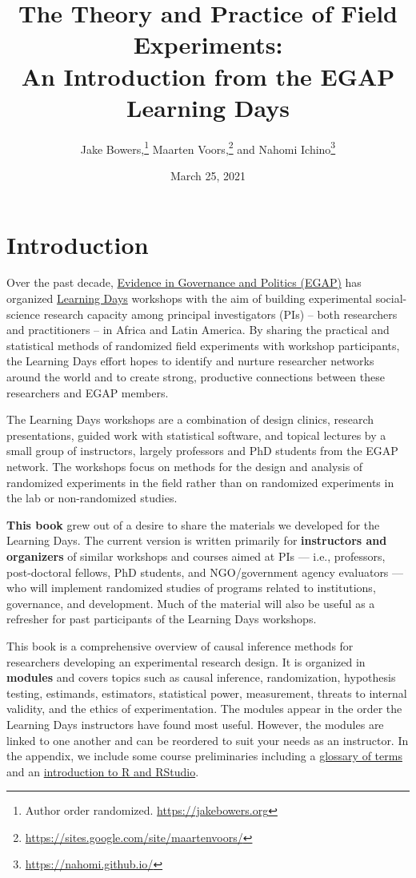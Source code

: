 \documentclass[12pt,]{book}
\title{The Theory and Practice of Field Experiments:\\
An Introduction from the EGAP Learning Days}
\author{Jake Bowers,\footnote{Author order randomized. \url{https://jakebowers.org}} Maarten Voors,\footnote{\url{https://sites.google.com/site/maartenvoors/}} and Nahomi Ichino\footnote{\url{https://nahomi.github.io/}}}
\date{March 25, 2021}
\begin{document}
\maketitle

\captionsetup[table]{list=no}
\captionsetup[figure]{list=no}

{
\hypersetup{linkcolor=}
\setcounter{tocdepth}{1}
\tableofcontents
}
\hypertarget{introduction}{%
\chapter{Introduction}\label{introduction}}

Over the past decade, \href{http://egap.org/}{Evidence in Governance and Politics (EGAP)} has organized \href{https://egap.org/learning-days/}{Learning Days} workshops with the aim of building experimental social-science research capacity among principal investigators (PIs) -- both researchers and practitioners -- in Africa and Latin America. By sharing the practical and statistical methods of randomized field experiments with workshop participants, the Learning Days effort hopes to identify and nurture researcher networks around the world and to create strong, productive connections between these researchers and EGAP members.

The Learning Days workshops are a combination of design clinics, research presentations, guided work with statistical software, and topical lectures by a small group of instructors, largely professors and PhD students from the EGAP network. The workshops focus on methods for the design and analysis of randomized experiments in the field rather than on randomized experiments in the lab or non-randomized studies.

\textbf{This book} grew out of a desire to share the materials we developed for the Learning Days. The current version is written primarily for \textbf{instructors and organizers} of similar workshops and courses aimed at PIs --- i.e., professors, post-doctoral fellows, PhD students, and NGO/government agency evaluators --- who will implement randomized studies of programs related to institutions, governance, and development. Much of the material will also be useful as a refresher for past participants of the Learning Days workshops.

This book is a comprehensive overview of causal inference methods for researchers developing an experimental research design. It is organized in \textbf{modules} and covers topics such as causal inference, randomization, hypothesis testing, estimands, estimators, statistical power, measurement, threats to internal validity, and the ethics of experimentation. The modules appear in the order the Learning Days instructors have found most useful. However, the modules are linked to one another and can be reordered to suit your needs as an instructor. In the appendix, we include some course preliminaries including a \href{glossary-of-terms.html}{glossary of terms} and an \href{introduction-to-r-and-rstudio.html}{introduction to R and RStudio}.
\end{document}
